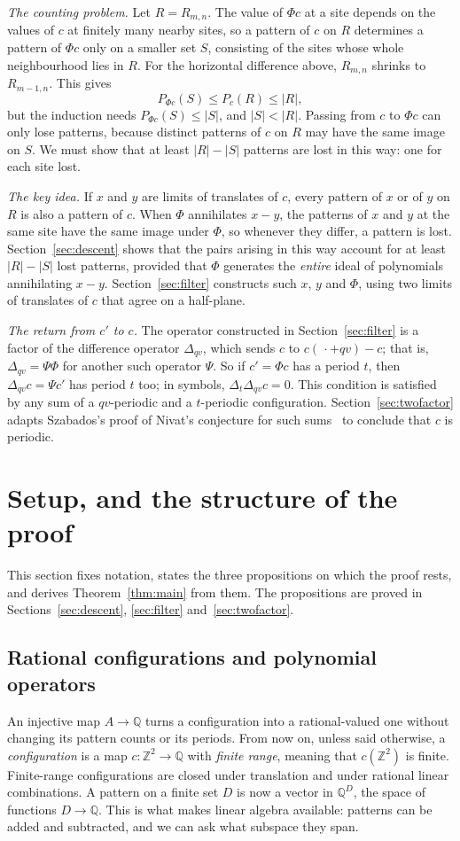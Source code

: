 \documentclass[11pt,a4paper,reqno]{amsart}
\theoremstyle{definition}
\theoremstyle{remark}
\newcommand{\Z}{\mathbb Z}
\newcommand{\Q}{\mathbb Q}
\newcommand{\De}{\Delta}
\numberwithin{equation}{section}
\begin{document}
\emph{The counting problem.} Let $R=R_{m,n}$. The value of $\Phi c$ at a site depends on the values of $c$ at finitely many nearby sites, so a pattern of $c$ on $R$ determines a pattern of $\Phi c$ only on a smaller set $S$, consisting of the sites whose whole neighbourhood lies in $R$. For the horizontal difference above, $R_{m,n}$ shrinks to $R_{m-1,n}$. This gives
\[
 P_{\Phi c}(S)\le P_c(R)\le|R|,
\]
but the induction needs $P_{\Phi c}(S)\le|S|$, and $|S|<|R|$. Passing from $c$ to $\Phi c$ can only lose patterns, because distinct patterns of $c$ on $R$ may have the same image on $S$. We must show that at least $|R|-|S|$ patterns are lost in this way: one for each site lost.

\emph{The key idea.} If $x$ and $y$ are limits of translates of $c$, every pattern of $x$ or of $y$ on $R$ is also a pattern of $c$. When $\Phi$ annihilates $x-y$, the patterns of $x$ and $y$ at the same site have the same image under $\Phi$, so whenever they differ, a pattern is lost. Section~\ref{sec:descent} shows that the pairs arising in this way account for at least $|R|-|S|$ lost patterns, provided that $\Phi$ generates the \emph{entire} ideal of polynomials annihilating $x-y$. Section~\ref{sec:filter} constructs such $x$, $y$ and $\Phi$, using two limits of translates of $c$ that agree on a half-plane.

\emph{The return from $c'$ to $c$.} The operator constructed in Section~\ref{sec:filter} is a factor of the difference operator $\De_{qv}$, which sends $c$ to $c(\,\cdot+qv)-c$; that is, $\De_{qv}=\Psi\Phi$ for another such operator $\Psi$. So if $c'=\Phi c$ has a period $t$, then $\De_{qv}c=\Psi c'$ has period $t$ too; in symbols, $\De_t\De_{qv}c=0$. This condition is satisfied by any sum of a $qv$-periodic and a $t$-periodic configuration. Section~\ref{sec:twofactor} adapts Szabados's proof of Nivat's conjecture for such sums~\cite{Sz} to conclude that $c$ is periodic.

\section{Setup, and the structure of the proof}\label{sec:setup}

This section fixes notation, states the three propositions on which the proof rests, and derives Theorem~\ref{thm:main} from them. The propositions are proved in Sections~\ref{sec:descent}, \ref{sec:filter} and~\ref{sec:twofactor}.

\subsection{Rational configurations and polynomial operators}
An injective map $A\to\Q$ turns a configuration into a rational-valued one without changing its pattern counts or its periods. From now on, unless said otherwise, a \emph{configuration} is a map $c\colon\Z^2\to\Q$ with \emph{finite range}, meaning that $c(\Z^2)$ is finite. Finite-range configurations are closed under translation and under rational linear combinations. A pattern on a finite set $D$ is now a vector in $\Q^D$, the space of functions $D\to\Q$. This is what makes linear algebra available: patterns can be added and subtracted, and we can ask what subspace they span.
\end{document}
